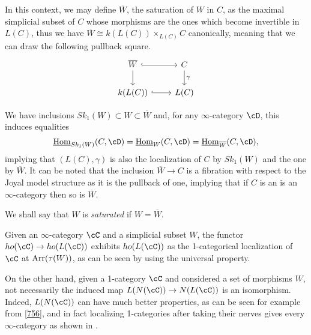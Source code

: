 \begin{rmk}\label{715}

  In this context, we may define $\overline{W}$, the saturation of $W$ in $C$,
  as the maximal simplicial subset of $C$
  whose morphisms are the ones which become invertible in $L(C)$, thus we have
  $\overline{W}\cong k(L(C))\times_{L(C)}C$ canonically, meaning that we can
  draw the following pullback square.
  \[\begin{tikzcd}
    {\overline{W}} & C \\
    {k(L(C))} & {L(C)}
    \arrow[hook, from=2-1, to=2-2]
    \arrow["\gamma", from=1-2, to=2-2]
    \arrow[hook, from=1-1, to=1-2]
    \arrow[from=1-1, to=2-1]
  \end{tikzcd}\]

  \noindent
  We have inclusions $Sk_1(W)\subset W\subset\overline{W}$ and, for any
  $\infty$-category $\cD$, this induces equalities
  \[\home_{Sk_1(W)}(C,\cD)=\home_{W}(C,\cD)=\home_{\overline{W}}(C,\cD),\]
  implying that $(L(C),\gamma)$ is also the localization of $C$ by $Sk_1(W)$
  and the one by $\overline{W}$. It can be noted that the inclusion
  $\overline{W}\rightarrow C$ is a fibration with respect to the Joyal model
  structure as it is the pullback of one, implying that if $C$ is an is an
  $\infty$-category then so is $\overline{W}$.

  \noindent
  We shall say that $W$ is \emph{saturated} if $W=\overline{W}$.
\end{rmk}

\begin{rmk}

  Given an $\infty$-category $\cC$ and a simplicial subset $W$, the functor
  $ho(\cC)\rightarrow ho(L(\cC))$ exhibits $ho(L(\cC))$ as the
  1-categorical localization of $\cC$ at $\operatorname{Arr}(\tau(W))$, as can be seen by
  using the universal property.

  \noindent
  On the other hand, given a 1-category $\cC$ and considered a set of
  morphisms $W$, not necessarily the induced map $L(N(\cC))\rightarrow
  N(L(\cC))$ is an isomorphism. Indeed, $L(N(\cC))$ can have much better
  properties, as can be seen for example from \ref{756}, and in fact localizing
  1-categories after taking their nerves gives every $\infty$-category as shown
  in \cite[Prop.\ 7.3.15]{Cis19}.
\end{rmk}


